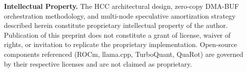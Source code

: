 \documentclass[11pt,a4paper]{article}
\begin{document}
\begin{tcolorbox}[colback=white, colframe=gray, boxrule=0.4pt, arc=2pt, left=8pt, right=8pt, top=6pt, bottom=6pt]
\textbf{Intellectual Property.} The HCC architectural design, zero-copy DMA-BUF orchestration methodology, and multi-node speculative amortization strategy described herein constitute proprietary intellectual property of the author. Publication of this preprint does not constitute a grant of license, waiver of rights, or invitation to replicate the proprietary implementation. Open-source components referenced (ROCm, llama.cpp, TurboQuant, QuaRot) are governed by their respective licenses and are not claimed as proprietary.

\end{tcolorbox}
\end{document}
